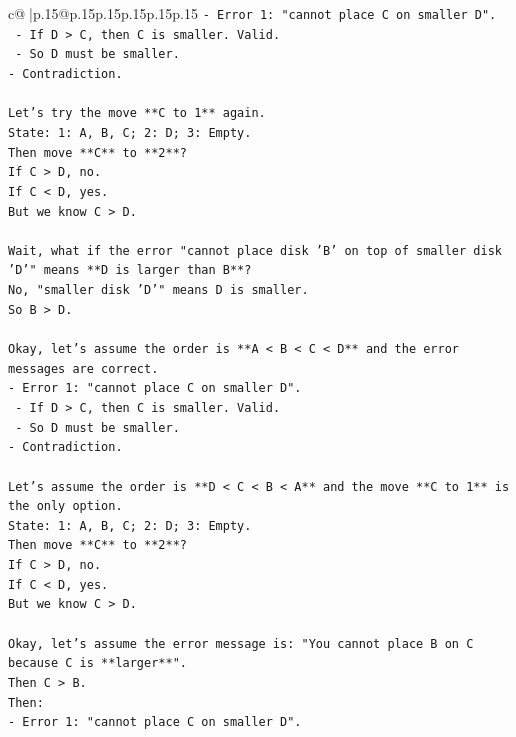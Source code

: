 \documentclass{article}
\begin{document}
{\begin{supertabular}{c@{$\;$}|p{.15\linewidth}@{}p{.15\linewidth}p{.15\linewidth}p{.15\linewidth}p{.15\linewidth}p{.15\linewidth}}
{{{\texttt{{-} Error 1: "cannot place C on smaller D".} \\
\texttt{    {-} If D > C, then C is smaller. Valid.} \\
\texttt{    {-} So D must be smaller.} \\
\texttt{{-} Contradiction.} \\
\\ 
\texttt{Let's try the move **C to 1** again.} \\
\texttt{State: 1: A, B, C; 2: D; 3: Empty.} \\
\texttt{Then move **C** to **2**?} \\
\texttt{If C > D, no.} \\
\texttt{If C < D, yes.} \\
\texttt{But we know C > D.} \\
\\ 
\texttt{Wait, what if the error "cannot place disk 'B' on top of smaller disk 'D'" means **D is larger than B**?} \\
\texttt{No, "smaller disk 'D'" means D is smaller.} \\
\texttt{So B > D.} \\
\\ 
\texttt{Okay, let's assume the order is **A < B < C < D** and the error messages are correct.} \\
\texttt{{-} Error 1: "cannot place C on smaller D".} \\
\texttt{    {-} If D > C, then C is smaller. Valid.} \\
\texttt{    {-} So D must be smaller.} \\
\texttt{{-} Contradiction.} \\
\\ 
\texttt{Let's assume the order is **D < C < B < A** and the move **C to 1** is the only option.} \\
\texttt{State: 1: A, B, C; 2: D; 3: Empty.} \\
\texttt{Then move **C** to **2**?} \\
\texttt{If C > D, no.} \\
\texttt{If C < D, yes.} \\
\texttt{But we know C > D.} \\
\\ 
\texttt{Okay, let's assume the error message is: "You cannot place B on C because C is **larger**".} \\
\texttt{Then C > B.} \\
\texttt{Then:} \\
\texttt{{-} Error 1: "cannot place C on smaller D".} \\
}}}
\end{supertabular}}
\end{document}
